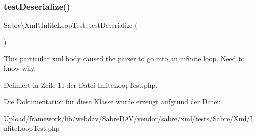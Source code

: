 \subsubsection{\texorpdfstring{test\+Deserialize()}{testDeserialize()}}
{\footnotesize\ttfamily Sabre\textbackslash{}\+Xml\textbackslash{}\+Infite\+Loop\+Test\+::test\+Deserialize (\begin{DoxyParamCaption}{ }\end{DoxyParamCaption})}

This particular xml body caused the parser to go into an infinite loop. Need to know why. 

Definiert in Zeile 11 der Datei Infite\+Loop\+Test.\+php.



Die Dokumentation für diese Klasse wurde erzeugt aufgrund der Datei\+:\begin{DoxyCompactItemize}
\item 
Upload/framework/lib/webdav/\+Sabre\+D\+A\+V/vendor/sabre/xml/tests/\+Sabre/\+Xml/Infite\+Loop\+Test.\+php\end{DoxyCompactItemize}
